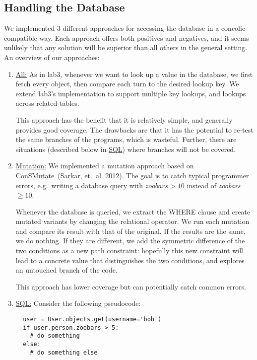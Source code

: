 \documentclass{scrartcl}
\begin{document}
\subsection{Handling the Database}
We implemented 3 different approaches for accessing the database in a
concolic-compatible way. Each approach offers both positives and
negatives, and it seems unlikely that any solution will be superior
than all others in the general setting. An overview of our approaches:

\begin{enumerate}
\item \underline{All:}
  As in lab3, whenever we want to look up a value
  in the database, we first fetch every object, then compare each turn to the
  desired lookup key. We extend lab3's implementation to support multiple key
  lookups, and lookups across related tables.

  This approach has the benefit that it is relatively simple, and generally
  provides good coverage. The drawbacks are that it has the potential to re-test
  the same branches of the programs, which is wasteful. Further, there are
  situations (described below in \underline{SQL}) where branches will not be
  covered.

\item \underline{Mutation:}
  We implemented a mutation approach based on
  ConSMutate~(Sarkar, et.\ al. 2012). The goal is to catch typical
  programmer errors, e.g.\ writing a database query with
  $\textit{zoobars} > 10$ instead of \textit{zoobars }$ \geq 10$.

  Whenever the database is queried, we extract the WHERE clause and
  create mutated variants by changing the relational operator. We run
  each mutation and compare its result with that of the original. If
  the results are the same, we do nothing. If they are different, we
  add the symmetric difference of the two conditions as a new path
  constraint: hopefully this new constraint will lead to a concrete
  value that distinguishes the two conditions, and explores an
  untouched branch of the code.

  This approach has lower coverage but can potentially catch common errors.

\item \underline{SQL:}
  Consider the following pseudocode:
  \begin{verbatim}
  user = User.objects.get(username='bob')
  if user.person.zoobars > 5:
    # do something
  else:
    # do something else
  \end{verbatim}


\end{enumerate}
\end{document}
